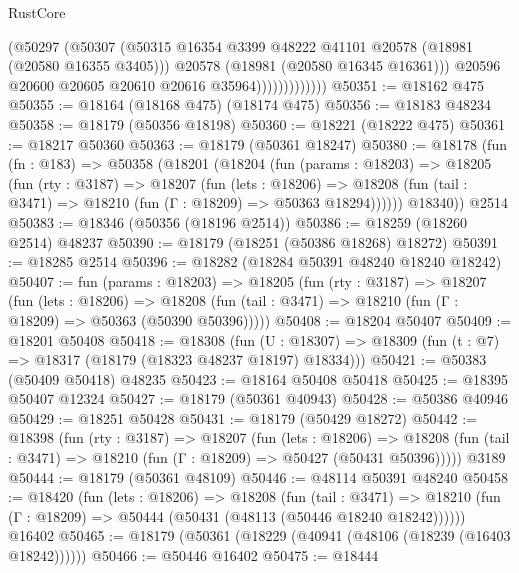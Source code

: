 \begin{lexlean}{RustCore}
\begin{coremodule}
                            (@50297
                              (@50307
                                (@50315
                                  @16354
                                  @3399
                                  @48222
                                  @41101
                                  @20578
                                  (@18981 (@20580 @16355 @3405)))
                                @20578
                                (@18981 (@20580 @16345 @16361)))
                              @20596
                              @20600
                              @20605
                              @20610
                              @20616
                              @35964)))))))))))))
@50351 := @18162 @475
@50355 := @18164 (@18168 @475) (@18174 @475)
@50356 := @18183 @48234
@50358 := @18179 (@50356 @18198)
@50360 := @18221 (@18222 @475)
@50361 := @18217 @50360
@50363 := @18179 (@50361 @18247)
@50380 := @18178
    (fun (fn : @183) =>
    @50358
      (@18201
        (@18204
          (fun (params : @18203) =>
          @18205
            (fun (rty : @3187) =>
            @18207
              (fun (lets : @18206) =>
              @18208 (fun (tail : @3471) => @18210 (fun (Γ : @18209) => @50363 @18294))))))
        @18340))
    @2514
@50383 := @18346 (@50356 (@18196 @2514))
@50386 := @18259 (@18260 @2514) @48237
@50390 := @18179 (@18251 (@50386 @18268) @18272)
@50391 := @18285 @2514
@50396 := @18282 (@18284 @50391 @48240 @18240 @18242)
@50407 := fun (params : @18203) =>
  @18205
    (fun (rty : @3187) =>
    @18207
      (fun (lets : @18206) =>
      @18208 (fun (tail : @3471) => @18210 (fun (Γ : @18209) => @50363 (@50390 @50396)))))
@50408 := @18204 @50407
@50409 := @18201 @50408
@50418 := @18308
    (fun (U : @18307) => @18309 (fun (t : @7) => @18317 (@18179 (@18323 @48237 @18197) @18334)))
@50421 := @50383 (@50409 @50418) @48235
@50423 := @18164 @50408 @50418
@50425 := @18395 @50407 @12324
@50427 := @18179 (@50361 @40943)
@50428 := @50386 @40946
@50429 := @18251 @50428
@50431 := @18179 (@50429 @18272)
@50442 := @18398
    (fun (rty : @3187) =>
    @18207
      (fun (lets : @18206) =>
      @18208 (fun (tail : @3471) => @18210 (fun (Γ : @18209) => @50427 (@50431 @50396)))))
    @3189
@50444 := @18179 (@50361 @48109)
@50446 := @48114 @50391 @48240
@50458 := @18420
    (fun (lets : @18206) =>
    @18208
      (fun (tail : @3471) =>
      @18210 (fun (Γ : @18209) => @50444 (@50431 (@48113 (@50446 @18240 @18242))))))
    @16402
@50465 := @18179 (@50361 (@18229 (@40941 (@48106 (@18239 (@16403 @18242))))))
@50466 := @50446 @16402
@50475 := @18444

\end{coremodule}
\end{lexlean}

